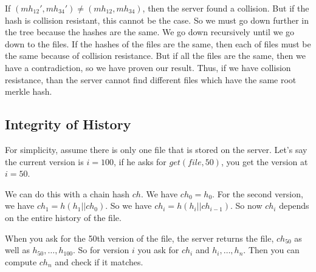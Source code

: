 \documentclass[psamsfonts]{amsart}
\begin{document}
If $(mh_{12}', mh_{34}') \neq (mh_{12}, mh_{34})$, then the server found a collision. But if the hash is collision resistant, this cannot be the case. So we must go down further in the tree because the hashes are the same. We go down recursively until we go down to the files. If the hashes of the files are the same, then each of files must be the same because of collision resistance. But if all the files are the same, then we have a contradiction, so we have proven our result. Thus, if we have collision resistance, than the server cannot find different files which have the same root merkle hash.

\subsection{Integrity of History}

For simplicity, assume there is only one file that is stored on the server. Let's say the current version is $i=100$, if he asks for $get(file, 50)$, you get the version at $i=50$.

We can do this with a chain hash $ch$. We have $ch_0 = h_0$. For the second version, we have $ch_1 = h(h_1 || ch_0)$. So we have $ch_{i} = h(h_{i} || ch_{i-1})$. So now $ch_{i}$ depends on the entire history of the file.

When you ask for the 50th version of the file, the server returns the file, $ch_{50}$ as well as $h_{50}, \ldots, h_{100}$. So for version $i$ you ask for $ch_{i}$ and $h_{i}, \ldots, h_{n}$. Then you can compute $ch_{n}$ and check if it matches.
\end{document}
